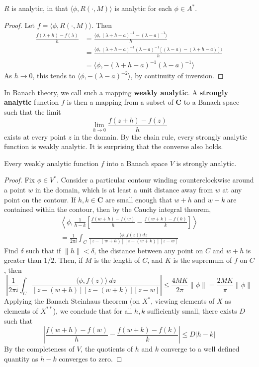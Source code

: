 \begin{lemma}
    $R$ is analytic, in that $\langle \phi, R(\cdot, M) \rangle$ is analytic for each $\phi \in A^*$.
\end{lemma}
\begin{proof}
    Let $f = \langle \phi, R(\cdot, M) \rangle$. Then
    \begin{align*}
        \frac{f(\lambda + h) - f(\lambda)}{h} &= \frac{\langle \phi, (\lambda + h - a)^{-1} - (\lambda - a)^{-1} \rangle}{h}\\
        &= \frac{\langle \phi, (\lambda + h - a)^{-1} (\lambda - a)^{-1} [(\lambda - a) - (\lambda + h - a)] \rangle}{h}\\
        &= \langle \phi, -(\lambda + h - a)^{-1} (\lambda - a)^{-1} \rangle
    \end{align*}
    As $h \to 0$, this tends to $\langle \phi, - (\lambda - a)^{-2} \rangle$, by continuity of inversion.
\end{proof}

In Banach theory, we call such a mapping {\bf weakly analytic}. A {\bf strongly analytic} function $f$ is then a mapping from a subset of $\mathbf{C}$ to a Banach space such that the limit
%
\[ \lim_{h \to 0} \frac{f(z + h) - f(z)}{h} \]
%
exists at every point $z$ in the domain. By the chain rule, every strongly analytic function is weakly analytic. It is surprising that the converse also holds.

\begin{theorem}
    Every weakly analytic function $f$ into a Banach space $V$ is strongly analytic.
\end{theorem}
\begin{proof}
    Fix $\phi \in V^*$. Consider a particular contour winding counterclockwise around a point $w$ in the domain, which is at least a unit distance away from $w$ at any point on the contour. If $h,k \in \mathbf{C}$ are small enough that $w + h$ and $w + k$ are contained within the contour, then by the Cauchy integral theorem,
    \begin{align*}
        \left\langle \phi, \frac{1}{h-k} \left[ \frac{f(w + h) - f(w)}{h} - \frac{f(w + k) - f(k)}{k} \right] \right\rangle\\
        = \frac{1}{2\pi i} \int_C \frac{\langle \phi, f(z) \rangle\ dz}{[z - (w + h)][z - (w + k)][z - w]}
    \end{align*}
    Find $\delta$ such that if $\| h \| < \delta$, the distance between any point on $C$ and $w + h$ is greater than $1/2$. Then, if $M$ is the length of $C$, and $K$ is the supremum of $f$ on $C$, then
    \[ \left| \frac{1}{2\pi i} \int_C \frac{\langle \phi, f(z) \rangle\ dz}{[z - (w + h)][z - (w + k)][z - w]}\right| \leq \frac{4MK}{2 \pi} \| \phi \| = \frac{2MK}{\pi} \| \phi \| \]
    Applying the Banach Steinhaus theorem (on $X^*$, viewing elements of $X$ as elements of $X^{**}$), we conclude that for all $h,k$ sufficiently small, there exists $D$ such that
    \[ \left| \frac{f(w + h) - f(w)}{h} - \frac{f(w + k) - f(k)}{k} \right| \leq D |h - k| \]
    By the completeness of $V$, the quotients of $h$ and $k$ converge to a well defined quantity as $h - k$ converges to zero.
\end{proof}


